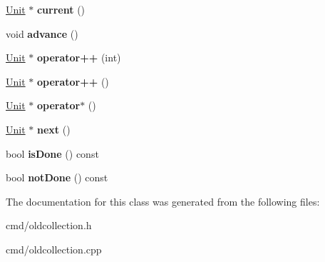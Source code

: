 \begin{DoxyCompactItemize}
\item 
\hyperlink{classUnit}{Unit} $\ast$ {\bfseries current} ()\hypertarget{classUnitCollection_1_1FastIterator_aa5eadb449f9feb45f829017355fe95ec}{}\label{classUnitCollection_1_1FastIterator_aa5eadb449f9feb45f829017355fe95ec}

\item 
void {\bfseries advance} ()\hypertarget{classUnitCollection_1_1FastIterator_ad09949ecf3aea2349f5ebcbb36f04f99}{}\label{classUnitCollection_1_1FastIterator_ad09949ecf3aea2349f5ebcbb36f04f99}

\item 
\hyperlink{classUnit}{Unit} $\ast$ {\bfseries operator++} (int)\hypertarget{classUnitCollection_1_1FastIterator_a2e7608926db898df77155d17ed4220e8}{}\label{classUnitCollection_1_1FastIterator_a2e7608926db898df77155d17ed4220e8}

\item 
\hyperlink{classUnit}{Unit} $\ast$ {\bfseries operator++} ()\hypertarget{classUnitCollection_1_1FastIterator_a1e375b4c68ca105440056f81b37aebaf}{}\label{classUnitCollection_1_1FastIterator_a1e375b4c68ca105440056f81b37aebaf}

\item 
\hyperlink{classUnit}{Unit} $\ast$ {\bfseries operator$\ast$} ()\hypertarget{classUnitCollection_1_1FastIterator_ac463709c044ced96ea7591f764c8ca24}{}\label{classUnitCollection_1_1FastIterator_ac463709c044ced96ea7591f764c8ca24}

\item 
\hyperlink{classUnit}{Unit} $\ast$ {\bfseries next} ()\hypertarget{classUnitCollection_1_1FastIterator_a6ad356d8cc5702099a7a5bdf47fa3a0c}{}\label{classUnitCollection_1_1FastIterator_a6ad356d8cc5702099a7a5bdf47fa3a0c}

\item 
bool {\bfseries is\+Done} () const \hypertarget{classUnitCollection_1_1FastIterator_a39c400991a0204ec7e63a5c4c3d0ac29}{}\label{classUnitCollection_1_1FastIterator_a39c400991a0204ec7e63a5c4c3d0ac29}

\item 
bool {\bfseries not\+Done} () const \hypertarget{classUnitCollection_1_1FastIterator_a63531727f9528eec162291ecebdd2195}{}\label{classUnitCollection_1_1FastIterator_a63531727f9528eec162291ecebdd2195}

\end{DoxyCompactItemize}


The documentation for this class was generated from the following files\+:\begin{DoxyCompactItemize}
\item 
cmd/oldcollection.\+h\item 
cmd/oldcollection.\+cpp\end{DoxyCompactItemize}
